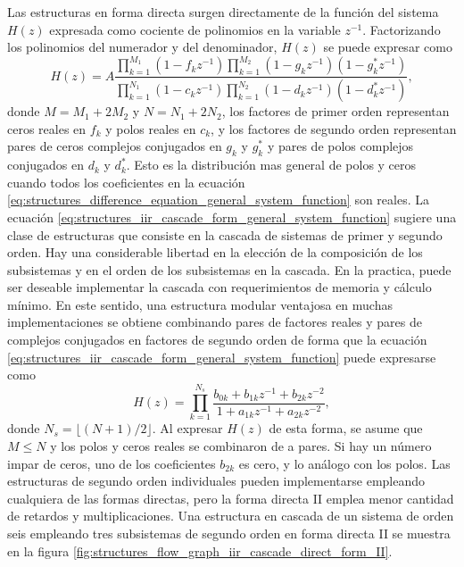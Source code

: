 \documentclass[a4paper]{report}
\begin{document}
Las estructuras en forma directa surgen directamente de la función del sistema \(H(z)\) expresada como cociente de polinomios en la variable \(z^{-1}\). Factorizando los polinomios del numerador y del denominador, \(H(z)\) se puede expresar como
\begin{equation}\label{eq:structures_iir_cascade_form_general_system_function}
 H(z)=A\dfrac{\displaystyle\prod_{k=1}^{M_1}(1-f_kz^{-1})\prod_{k=1}^{M_2}(1-g_kz^{-1})(1-g^*_kz^{-1})}{\displaystyle\prod_{k=1}^{N_1}(1-c_kz^{-1})\prod_{k=1}^{N_2}(1-d_kz^{-1})(1-d^*_kz^{-1})}, 
\end{equation}
donde \(M=M_1+2M_2\) y \(N=N_1+2N_2\), los factores de primer orden representan ceros reales en \(f_k\) y  polos reales en \(c_k\), y los factores de segundo orden representan pares de ceros complejos conjugados en \(g_k\) y \(g^*_k\) y pares de polos complejos conjugados en \(d_k\) y \(d^*_k\). Esto es la distribución mas general de polos y ceros cuando todos los coeficientes en la ecuación \ref{eq:structures_difference_equation_general_system_function} son reales. La ecuación \ref{eq:structures_iir_cascade_form_general_system_function} sugiere una clase de estructuras que consiste en la cascada de sistemas de primer y segundo orden. Hay una considerable libertad en la elección de la composición de los subsistemas y en el orden de los subsistemas en la cascada. En la practica, puede ser deseable implementar la cascada con requerimientos de memoria y cálculo mínimo. En este sentido, una estructura modular ventajosa en muchas implementaciones se obtiene combinando pares de factores reales y pares de complejos conjugados en factores de segundo orden de forma que la ecuación \ref{eq:structures_iir_cascade_form_general_system_function} puede expresarse como
\begin{equation}\label{eq:structures_iir_cascade_form_second_order_system_function}
 H(z)=\prod_{k=1}^{N_s}\frac{b_{0k}+b_{1k}z^{-1}+b_{2k}z^{-2}}{1+a_{1k}z^{-1}+a_{2k}z^{-2}},  
\end{equation}
donde \(N_s=\lfloor(N+1)/2\rfloor\). Al expresar \(H(z)\) de esta forma, se asume que \(M\leq N\) y los polos y ceros reales se combinaron de a pares. Si hay un número impar de ceros, uno de los coeficientes \(b_{2k}\) es cero, y lo análogo con los polos. Las estructuras de segundo orden individuales pueden implementarse empleando cualquiera de las formas directas, pero la forma directa II emplea menor cantidad de retardos y multiplicaciones. Una estructura en cascada de un sistema de orden seis empleando tres subsistemas de segundo orden en forma directa II se muestra en la figura \ref{fig:structures_flow_graph_iir_cascade_direct_form_II}.
\end{document}
